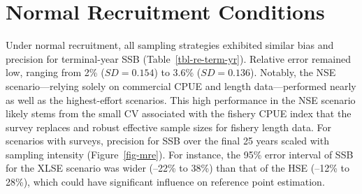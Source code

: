 \documentclass[
  letterpaper,
  12pt,
  letterpaper]{report}
\begin{document}
\section{Normal Recruitment
Conditions}\label{normal-recruitment-conditions}

Under normal recruitment, all sampling strategies exhibited similar bias
and precision for terminal-year SSB (Table~\ref{tbl-re-term-yr}).
Relative error remained low, ranging from 2\% (\(SD = 0.154\)) to 3.6\%
(\(SD = 0.136\)). Notably, the NSE scenario---relying solely on
commercial CPUE and length data---performed nearly as well as the
highest-effort scenarios. This high performance in the NSE scenario
likely stems from the small CV associated with the fishery CPUE index
that the survey replaces and robust effective sample sizes for fishery
length data. For scenarios with surveys, precision for SSB over the
final 25 years scaled with sampling intensity (Figure~\ref{fig-mre}).
For instance, the 95\% error interval of SSB for the XLSE scenario was
wider (--22\% to 38\%) than that of the HSE (--12\% to 28\%), which
could have significant influence on reference point estimation.
\end{document}
